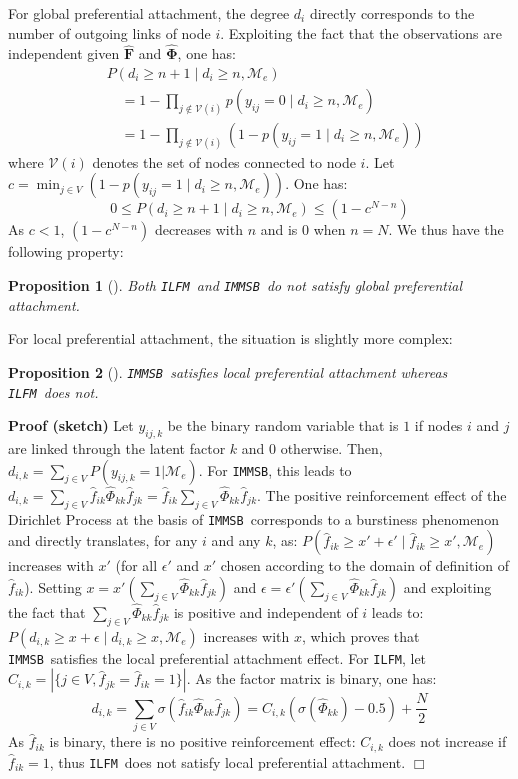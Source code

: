 \documentclass[journal]{IEEEtran}
\newcommand{\ifm}{\texttt{ILFM}}
\newcommand{\imb}{\texttt{IMMSB}}
\newcommand{\pr}{P}
\newcommand{\mat}[1]{\mathbf{#1}}
\newtheorem{proposition}{Proposition}[section]
\begin{document}
For global preferential attachment, the degree $d_i$ directly corresponds to the number of outgoing links of node $i$. Exploiting the fact that the observations are independent given $\mat{\hat{F}}$ and $\mat{\hat{\Phi}}$, one has:
%
\begin{align}
&\pr(d_{i} \ge n+1 \mid d_{i} \ge n, \mathcal{M}_e) \nonumber \\
& \quad= 1 - \prod_{j \notin \mathcal{V}(i)} p(y_{ij} = 0 \mid d_{i} \ge n, \mathcal{M}_e) \nonumber \\
& \quad = 1 - \prod_{j \notin \mathcal{V}(i)} (1 - p(y_{ij} = 1 \mid d_{i} \ge n, \mathcal{M}_e)) \nonumber
\end{align}
%
where $\mathcal{V}(i)$ denotes the set of nodes connected to node $i$. Let $c=\min_{j \in V}  (1-p(y_{ij} = 1 \mid d_{i} \ge n, \mathcal{M}_e))$. One has:
%
\[
0 \le \pr(d_{i} \ge n+1 \mid d_{i} \ge n, \mathcal{M}_e) \le (1 - c^{N-n})
\]
%
As $c < 1$,  $(1 - c^{N-n})$ decreases with $n$ and is $0$ when $n=N$. We thus have the following property:
%
\begin{proposition}[]
\label{pref-attch-glob}
Both \ifm\ and \imb\ do not satisfy global preferential attachment.
\end{proposition}
%
For local preferential attachment, the situation is slightly more complex:
%
\begin{proposition}[]
\label{pref-attch-loc}
\imb\ satisfies local preferential attachment whereas \ifm\ does not.
\end{proposition}
%
\noindent \textbf{Proof (sketch)} Let $y_{ij,k}$ be the binary random variable that is $1$ if nodes $i$ and $j$ are linked through the latent factor $k$ and $0$ otherwise. Then, $d_{i,k} = \sum_{j \in V} \pr(y_{ij,k} =1 | \mathcal{M}_e)$. For \imb, this leads to $d_{i,k} = \sum_{j \in V} \hat{f}_{ik} \hat{\Phi}_{kk} \hat{f}_{jk} = \hat{f}_{ik} \sum_{j \in V} \hat{\Phi}_{kk} \hat{f}_{jk}$. The positive reinforcement effect of the Dirichlet Process \cite{HDP} at the basis of \imb\ corresponds to a burstiness phenomenon and directly translates, for any $i$ and any $k$, as: $\pr(\hat{f}_{ik} \ge x'+\epsilon' \mid \hat{f}_{ik} \ge x',\mathcal{M}_e)$ increases with $x'$ (for all $\epsilon'$ and $x'$ chosen according to the domain of definition of $\hat{f}_{ik}$). Setting $x=x'(\sum_{j\in V} \hat{\Phi}_{kk} \hat{f}_{jk})$ and $\epsilon = \epsilon'(\sum_{j\in V} \hat{\Phi}_{kk} \hat{f}_{jk})$ and exploiting the fact that $\sum_{j\in V} \hat{\Phi}_{kk} \hat{f}_{jk}$ is positive and independent of $i$ leads to: $\pr(d_{i,k} \ge x+\epsilon \mid d_{i,k} \ge x, \mathcal{M}_e)$ increases with $x$, which proves that \imb\ satisfies the local preferential attachment effect. For \ifm,  let $C_{i,k} = |\{j \in V, \hat{f}_{jk} = \hat{f}_{ik} = 1\}|$. As the factor matrix is binary, one has:
%
\[ 
d_{i,k} = \sum_{j\in V} \sigma(\hat{f}_{ik} \hat{\Phi}_{kk} \hat{f}_{jk}) =  C_{i,k} (\sigma(\hat{\Phi}_{kk})-0.5) + \frac{N}{2}
\]
%
As $\hat{f}_{ik}$ is binary, there is no positive reinforcement effect: $C_{i,k}$ does not increase if $\hat{f}_{ik}=1$, thus \ifm\ does not satisfy local preferential attachment. \hspace{4.69cm} $\Box$
\end{document}
